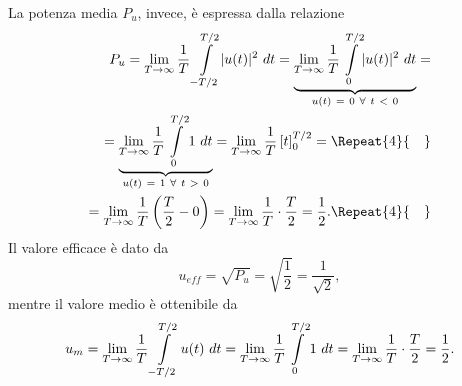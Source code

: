 \documentclass[12pt,oneside,openany]{memoir}
\numberwithin{equation}{subsection}
\DeclarePairedDelimiter{\abs}{\lvert}{\rvert}
\newcommand{\quads}[1]{\Repeat{#1}{\quad}}
\newcommand{\dt}{\ dt}
\begin{document}
La potenza media $P_u$, invece, \`e espressa dalla relazione
\begin{equation}
	\begin{split}
		P_u = \lim_{T \rightarrow \infty} \frac{1}{T} 
		\int\displaylimits_{-T/2}^{T/2} \abs{u(t)}^2 \dt = 
		\underbrace{\lim_{T \rightarrow \infty} \frac{1}{T} 
		\int\displaylimits_{0}^{T/2} \abs{u(t)}^2 \dt}_{u(t) \ = \ 0 \ 
		\forall \ t \ < \ 0} =
		\\
		= \underbrace{\lim_{T \rightarrow \infty} \frac{1}{T} 
		\int\displaylimits_{0}^{T/2} 1 \dt}_{u(t) \ = \ 1 \ \forall \ 
		t \ > \ 0} = \lim_{T \rightarrow \infty} \frac{1}{T} \left[ t 
		\right]_0^{T/2} =
		\quads{4}
		\\
		= \lim_{T \rightarrow \infty} \frac{1}{T} \left(\frac{T}{2} - 0
		\right) = \lim_{T \rightarrow \infty} \frac{1}{T} \cdot 
		\frac{T}{2} = \frac{1}{2}.
		\quads{4}
	\end{split}
\end{equation}
Il valore efficace \`e dato da
\begin{equation}
	u_{eff} = \sqrt{P_u} = \sqrt{\frac{1}{2}} = \frac{1}{\sqrt{2}},
\end{equation}
mentre il valore medio \`e ottenibile da
\begin{equation}
	\begin{split}
		u_m = \lim_{T \rightarrow \infty} \frac{1}{T} 
		\int\displaylimits_{-T/2}^{T/2} u(t) \dt = \lim_{T \rightarrow 
		\infty} \frac{1}{T} \int\displaylimits_{0}^{T/2} 1 \dt = 
		\lim_{T \rightarrow \infty} \frac{1}{T} \cdot \frac{T}{2} = 
		\frac{1}{2}.
	\end{split}
\end{equation}
\end{document}
